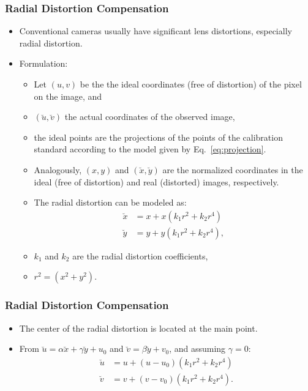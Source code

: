 \documentclass{beamer}
\begin{document}
		\begin{frame}\frametitle{Radial Distortion Compensation}
			\begin{itemize}
			 \item Conventional cameras usually have significant lens distortions, especially radial distortion.
			 \item Formulation:
			 \begin{itemize}
			  \item Let $(u,v)$ be the the ideal coordinates (free of distortion) of the pixel on the image, and
			  \item $(\breve{u},\breve{v})$ the actual coordinates of the observed image,
			  \item the ideal points are the projections of the points of the calibration standard according to the model given by Eq.~\eqref{eq:projection}.
			  \item Analogously, $(x,y)$ and $(\breve{x},\breve{y})$ are the normalized coordinates in the ideal (free of distortion) and real (distorted) images, respectively.
			  \item The radial distortion can be modeled as:
			\begin{align*}
			\breve{x} &= x + x(k_1 r^2 + k_2 r^4) \\%
			\breve{y} &= y + y(k_1 r^2 + k_2 r^4), %
			\end{align*}
			\item $k_1$ and $k_2$ are the radial distortion coefficients,
			\item $r^2 = (x^2 + y^2)$.
			 \end{itemize}
			\end{itemize}
		\end{frame}


		\begin{frame}
			\frametitle{Radial Distortion Compensation}
			\begin{itemize}
			 \item The center of the radial distortion is located at the main point.
			 \item From $\breve{u} = \alpha \breve{x} + \gamma \breve{y} + u_0 $ and $\breve{v} = \beta \breve{y} + v_0$, and assuming $\gamma = 0$:
			  \begin{align*}
			    \breve{u} &= u + (u-u_0)(k_1 r^2 + k_2 r^4 ) \\
			    \breve{v} &= v + (v-v_0)(k_1 r^2 + k_2 r^4 ).
			  \end{align*}
			\end{itemize}
		\end{frame}
\end{document}

